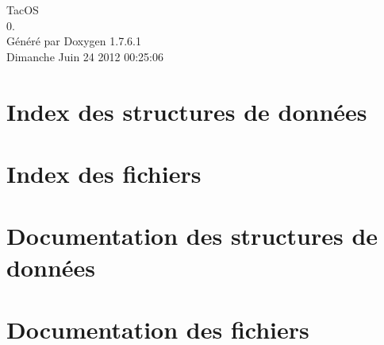 \documentclass[a4paper]{book}
\begin{document}
\hypersetup{pageanchor=false,citecolor=blue}
\begin{titlepage}
\vspace*{7cm}
\begin{center}
{\Large \-Tac\-O\-S \\[1ex]\large 0. }\\
\vspace*{1cm}
{\large \-Généré par Doxygen 1.7.6.1}\\
\vspace*{0.5cm}
{\small Dimanche Juin 24 2012 00:25:06}\\
\end{center}
\end{titlepage}
\clearemptydoublepage
{}
\tableofcontents
\clearemptydoublepage
{}
\hypersetup{pageanchor=true,citecolor=blue}
\chapter{\-Index des structures de données}

\chapter{\-Index des fichiers}

\chapter{\-Documentation des structures de données}












\chapter{\-Documentation des fichiers}
























































\printindex
\end{document}

